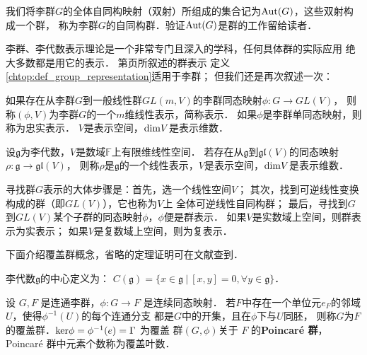 我们将李群$G$的全体自同构映射（双射）所组成的集合记为${\rm Aut}(G)$，这些双射构成一个群，
称为李群$G$的{\heiti 自同构群}．验证${\rm Aut}(G)$是群的工作留给读者．



李群、李代数表示理论是一个非常专门且深入的学科，任何具体群的实际应用
绝大多数都是用它的表示．
第\pageref{chtop:def_group_representation}页所叙述的群表示
定义\ref{chtop:def_group_representation}适用于李群；
但我们还是再次叙述一次：
\begin{definition}
    如果存在从李群$G$到一般线性群$GL(m,V)$的李群同态映射$\phi:G\to GL(V)$，
    则称$(\phi,V)$为李群$G$的一个$m$维{\heiti 线性表示}，简称{\heiti 表示}．
    如果$\phi$是李群单同态映射，则称为{\heiti  忠实表示}．
    $V$是表示空间，${\rm dim}V$是表示{\heiti 维数}．
\end{definition}

\begin{definition}
    设$\mathfrak{g}$为李代数，$V$是数域$\mathbb{F}$上有限维线性空间．
    若存在从$\mathfrak{g}$到$\mathfrak{gl}(V)$的同态映射$\rho : \mathfrak{g}\to \mathfrak{gl}(V)$，
    则称$\rho$是$\mathfrak{g}$的一个{\heiti 线性表示}，$V$是表示空间，${\rm dim}V$是表示{\heiti 维数}．
\end{definition}


寻找群$G$表示的大体步骤是：首先，选一个线性空间$V$；
其次，找到可逆线性变换构成的群（即$GL(V)$），它也称为$V$上
全体可逆线性自同构群；
最后，寻找到$G$到$GL(V)$某个子群的同态映射$\phi$，$\phi$便是群表示．
如果$V$是实数域上空间，则群表示为{\heiti 实表示}；
如果$V$是复数域上空间，则为{\heiti 复表示}．




下面介绍覆盖群概念，省略的定理证明可在文献\parencite[p.231--240]{xuyc-2001}查到．
\begin{definition}
    李代数$\mathfrak{g}$的{\heiti 中心}定义为：
    $C(\mathfrak{g})=\{x\in \mathfrak{g}\ |\ [x,y]=0,\forall y\in\mathfrak{g}\}$．
\end{definition}

 

\begin{definition}
    设 $G, F$ 是连通李群，$\phi: G \rightarrow F$ 是连续同态映射．
    若$F$中存在一个单位元$e_F$的邻域$U$，使得$\phi^{-1}(U)$的每个连通分支
    都是$G$中的开集，且在$\phi$下与$U$同胚，
    则称$G$为$F$的{\heiti 覆盖群}．${\rm ker} \phi=\phi^{-1}(e)=\Gamma$ 为覆盖
    群$(G, \phi)$关于 $F$ 的{\heiti\bfseries Poincar\'e 群}，Poincar\'e 群中元素个数称为{\heiti 覆盖叶数}．
\end{definition}

